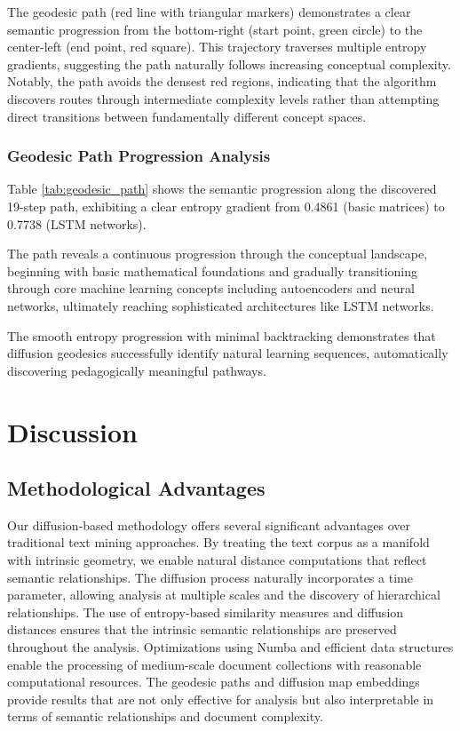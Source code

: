 \documentclass[12pt,a4paper]{article}
\begin{document}
The geodesic path (red line with triangular markers) demonstrates a clear semantic progression from the bottom-right (start point, green circle) to the center-left (end point, red square). This trajectory traverses multiple entropy gradients, suggesting the path naturally follows increasing conceptual complexity. Notably, the path avoids the densest red regions, indicating that the algorithm discovers routes through intermediate complexity levels rather than attempting direct transitions between fundamentally different concept spaces.

\subsubsection{Geodesic Path Progression Analysis}



Table \ref{tab:geodesic_path} shows the semantic progression along the discovered 19-step path, exhibiting a clear entropy gradient from 0.4861 (basic matrices) to 0.7738 (LSTM networks).

The path reveals a continuous progression through the conceptual landscape, beginning with basic mathematical foundations and gradually transitioning through core machine learning concepts including autoencoders and neural networks, ultimately reaching sophisticated architectures like LSTM networks.

The smooth entropy progression with minimal backtracking demonstrates that diffusion geodesics successfully identify natural learning sequences, automatically discovering pedagogically meaningful pathways.

\section{Discussion}

\subsection{Methodological Advantages}

Our diffusion-based methodology offers several significant advantages over traditional text mining approaches. By treating the text corpus as a manifold with intrinsic geometry, we enable natural distance computations that reflect semantic relationships. The diffusion process naturally incorporates a time parameter, allowing analysis at multiple scales and the discovery of hierarchical relationships. The use of entropy-based similarity measures and diffusion distances ensures that the intrinsic semantic relationships are preserved throughout the analysis. Optimizations using Numba and efficient data structures enable the processing of medium-scale document collections with reasonable computational resources. The geodesic paths and diffusion map embeddings provide results that are not only effective for analysis but also interpretable in terms of semantic relationships and document complexity.
\end{document}
